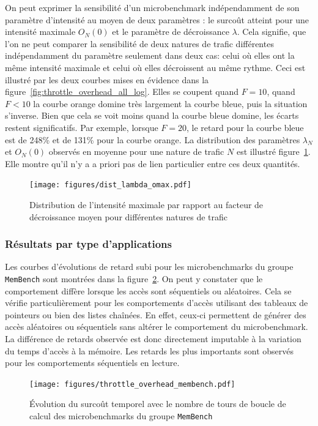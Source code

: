 On peut exprimer la sensibilité d'un microbenchmark indépendamment de son paramètre d'intensité au moyen de deux paramètres : le surcoût atteint pour une intensité maximale $O_N(0)$ et le paramètre de décroissance $\lambda$.
Cela signifie, que l'on ne peut comparer la sensibilité de deux natures de trafic différentes indépendamment du paramètre seulement dans deux cas: celui où elles ont la même intensité maximale et celui où elles décroissent au même rythme.
Ceci est illustré par les deux courbes mises en évidence dans la figure~\ref{fig:throttle_overhead_all_log}.
Elles se coupent quand $F = 10$, quand $F < 10$ la courbe orange domine très largement la courbe bleue, puis la situation s'inverse.
Bien que cela se voit moins quand la courbe bleue domine, les écarts restent significatifs. 
Par exemple, lorsque $F=20$, le retard pour la courbe bleue est de 248\% et de 131\% pour la courbe orange.
La distribution des paramètres $\lambda_N$ et $O_N(0)$ observés en moyenne pour une nature de trafic $N$ est illustré figure~\ref{fig:dist-lambda-omax}.
Elle montre qu'il n'y a a priori pas de lien particulier entre ces deux quantités.

\begin{figure}[!h]
	\centering
	\texttt{[image: figures/dist\_lambda\_omax.pdf]}
	\caption{\label{fig:dist-lambda-omax}Distribution de l'intensité maximale par rapport au facteur de décroissance moyen pour différentes natures de trafic}
\end{figure}

\subsubsection{Résultats par type d'applications}

Les courbes d'évolutions de retard subi pour les microbenchmarks du groupe \texttt{MemBench} sont montrées dans la figure~\ref{fig:throttle_overhead_membench}.
On peut y constater que le comportement diffère lorsque les accès sont séquentiels ou aléatoires.
Cela se vérifie particulièrement pour les comportements d'accès utilisant des tableaux de pointeurs ou bien des listes chaînées.
En effet, ceux-ci permettent de générer des accès aléatoires ou séquentiels sans altérer le comportement du microbenchmark.
La différence de retards observée est donc directement imputable à la variation du temps d'accès à la mémoire.
Les retards les plus importants sont observés pour les comportements séquentiels en lecture.

\begin{figure}[!p]
\texttt{[image: figures/throttle\_overhead\_membench.pdf]}
\caption{\label{fig:throttle_overhead_membench}Évolution du surcoût temporel avec le nombre de tours de boucle de calcul des microbenchmarks du groupe \texttt{MemBench}}
\end{figure}

